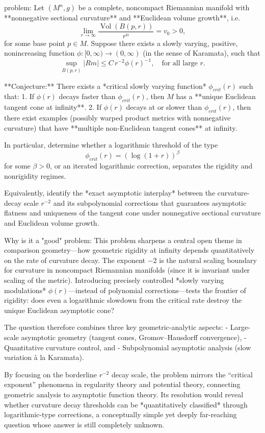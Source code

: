 problem:  
Let \((M^n, g)\) be a complete, noncompact Riemannian manifold with **nonnegative sectional curvature** and **Euclidean volume growth**, i.e.  
\[
\lim_{r \to \infty} \frac{\operatorname{Vol}(B(p, r))}{r^n} = v_0 > 0,
\]
for some base point \(p \in M\).  Suppose there exists a slowly varying, positive, nonincreasing function \(\phi:[0,\infty)\to (0,\infty)\) (in the sense of Karamata), such that  
\[
\sup_{B(p,r)} |Rm| \le C\, r^{-2} \phi(r)^{-1}, \quad \text{for all large } r.
\]

**Conjecture:**  
There exists a *critical slowly varying function* \(\phi_{crit}(r)\) such that:
1. If \(\phi(r)\) decays faster than \(\phi_{crit}(r)\), then \(M\) has a **unique Euclidean tangent cone at infinity**.  
2. If \(\phi(r)\) decays at or slower than \(\phi_{crit}(r)\), then there exist examples (possibly warped product metrics with nonnegative curvature) that have **multiple non-Euclidean tangent cones** at infinity.

In particular, determine whether a logarithmic threshold of the type
\[
\phi_{crit}(r) = (\log(1+r))^\beta
\]
for some \(\beta>0\), or an iterated logarithmic correction, separates the rigidity and nonrigidity regimes.

Equivalently, identify the *exact asymptotic interplay* between the curvature-decay scale \(r^{-2}\) and its subpolynomial corrections that guarantees asymptotic flatness and uniqueness of the tangent cone under nonnegative sectional curvature and Euclidean volume growth.

Why is it a "good" problem:  
This problem sharpens a central open theme in comparison geometry—how geometric rigidity at infinity depends quantitatively on the rate of curvature decay. The exponent \(-2\) is the natural scaling boundary for curvature in noncompact Riemannian manifolds (since it is invariant under scaling of the metric). Introducing precisely controlled *slowly varying modulations* \(\phi(r)\)—instead of polynomial corrections—tests the frontier of rigidity: does even a logarithmic slowdown from the critical rate destroy the unique Euclidean asymptotic cone?  

The question therefore combines three key geometric-analytic aspects:
- Large-scale asymptotic geometry (tangent cones, Gromov–Hausdorff convergence),
- Quantitative curvature control, and
- Subpolynomial asymptotic analysis (slow variation à la Karamata).

By focusing on the borderline \(r^{-2}\) decay scale, the problem mirrors the “critical exponent” phenomena in regularity theory and potential theory, connecting geometric analysis to asymptotic function theory. Its resolution would reveal whether curvature decay thresholds can be *quantitatively classified* through logarithmic-type corrections, a conceptually simple yet deeply far-reaching question whose answer is still completely unknown.